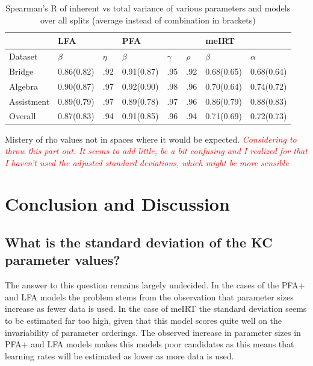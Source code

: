 \documentclass{scrartcl}
\newcommand\todo[1]{\textit{\textcolor{red}{#1}}}
\begin{document}
\begin{center}
\begin{table}[!htbp]
\begin{tabular}{| l || l | l ||l|l |l||l|l|}

    \hline
     & LFA  & & PFA & & &meIRT &   \\ \hline
    Dataset & $\beta$ & $\eta$ & $\beta$ & $\gamma$ & $\rho$ & $\beta$ & $\alpha$  \\ \hline
    Bridge     & 0.86(0.82) & .92 & 0.91(0.87) & .95 & .92 & 0.68(0.65)&0.68(0.64) \\ \hline
    Algebra    & 0.90(0.87) & .97 & 0.92(0.90) & .98 & .96 & 0.70(0.64)&0.74(0.72) \\ \hline
    Assistment & 0.89(0.79) & .97 & 0.89(0.78) & .97 & .96 & 0.86(0.79)&0.88(0.83) \\ \hline \hline
    Overall    & 0.87(0.83) & .94 & 0.91(0.85) & .96 & .94 & 0.71(0.69)&0.72(0.73) \\
    \hline
\end{tabular}
\caption{Spearman's R of inherent vs total variance of various parameters and models over all splits (average instead of combination in brackets)}
\label{tab:intorank}
\end{table}
\end{center}



Mistery of rho values not in spaces where it would be expected.
\todo{Considering to throw this part out. It seems to add little, be a bit confusing and I realized for that I haven't used the adjusted standard deviations, which might be more sensible}


\section{Conclusion and Discussion}
\subsection{What is the standard deviation of the KC parameter values?}
The answer to this question remains largely undecided. In the cases of the PFA+ and LFA models the problem stems from the observation that parameter sizes increase as fewer data is used. In the case of meIRT the standard deviation seems to be estimated far too high, given that this model scores quite well on the invariability of parameter orderings. The observed increase in parameter sizes in PFA+ and LFA models makes this models poor candidates as this means that learning rates will be estimated as lower as more data is used.
\end{document}
